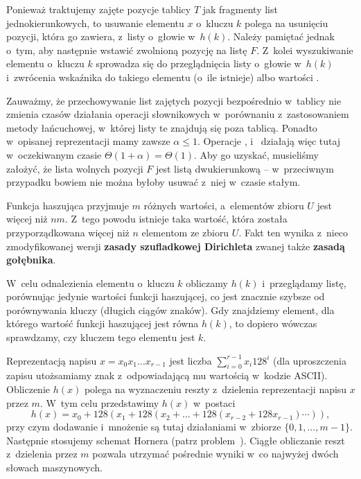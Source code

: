 Ponieważ traktujemy zajęte pozycje tablicy $T$ jak fragmenty list jednokierunkowych, to usuwanie elementu $x$ o~kluczu $k$ polega na usunięciu pozycji, która go zawiera, z~listy o~głowie w~$h(k)$.
Należy pamiętać jednak o~tym, aby następnie wstawić zwolnioną pozycję na listę $F$.
Z~kolei wyszukiwanie elementu o~kluczu $k$ sprowadza się do przeglądnięcia listy o~głowie w~$h(k)$ i~zwrócenia wskaźnika do takiego elementu (o~ile istnieje) albo wartości .

Zauważmy, że przechowywanie list zajętych pozycji bezpośrednio w~tablicy nie zmienia czasów działania operacji słownikowych w~porównaniu z~zastosowaniem metody łańcuchowej, w~której listy te znajdują się poza tablicą.
Ponadto w~opisanej reprezentacji mamy zawsze $\alpha\le1$.
Operacje ,  i~ działają więc tutaj w~oczekiwanym czasie $\Theta(1+\alpha)=\Theta(1)$.
Aby go uzyskać, musieliśmy założyć, że lista wolnych pozycji $F$ jest listą dwukierunkową -- w~przeciwnym przypadku bowiem nie można byłoby usuwać z~niej w~czasie stałym.

\exercise %
Funkcja haszująca przyjmuje $m$ różnych wartości, a~elementów zbioru $U$ jest więcej niż $nm$.
Z~tego powodu istnieje taka wartość, która została przyporządkowana więcej niż $n$ elementom ze zbioru $U$.
Fakt ten wynika z~nieco zmodyfikowanej wersji \textbf{zasady szufladkowej Dirichleta} \cite{pigeonholeprinciple} zwanej także \textbf{zasadą gołębnika}.


\exercise %
W~celu odnalezienia elementu o~kluczu $k$ obliczamy $h(k)$ i~przeglądamy listę, porównując jedynie wartości funkcji haszującej, co jest znacznie szybsze od porównywania kluczy (długich ciągów znaków).
Gdy znajdziemy element, dla którego wartość funkcji haszującej jest równa $h(k)$, to dopiero wówczas sprawdzamy, czy kluczem tego elementu jest $k$.

\exercise %
Reprezentacją napisu $x=x_0x_1\dots x_{r-1}$ jest liczba $\sum_{i=0}^{r-1}x_i128^i$ (dla uproszczenia zapisu utożsamiamy znak z~odpowiadającą mu wartością w~kodzie ASCII).
Obliczenie $h(x)$ polega na wyznaczeniu reszty z~dzielenia reprezentacji napisu $x$ przez $m$.
W~tym celu przedstawimy $h(x)$ w~postaci
\[
	h(x) = x_0+128(x_1+128(x_2+\dots+128(x_{r-2}+128x_{r-1})\cdots)),
\]
przy czym dodawanie i~mnożenie są tutaj działaniami w~zbiorze $\{0,1,\dots,m-1\}$.
Następnie stosujemy schemat Hornera (patrz problem~).
Ciągłe obliczanie reszt z~dzielenia przez $m$ pozwala utrzymać pośrednie wyniki w~co najwyżej dwóch słowach maszynowych.

